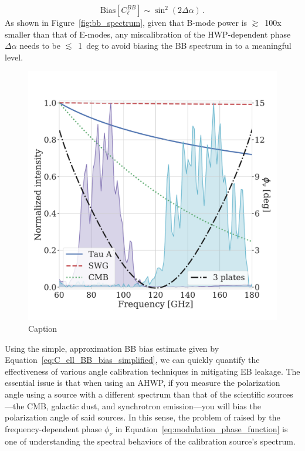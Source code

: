 \begin{equation}
    \mathrm{Bias}\left[ C_{\ell}^{BB} \right] \sim \sin^{2} \left( 2 \Delta \alpha \right) \, .
    \label{eq:C_ell_BB_bias_simplified}
\end{equation}
As shown in Figure~\ref{fig:bb_spectrum}, given that B-mode power is $\gtrsim$~100x smaller than that of E-modes, any miscalibration of the HWP-dependent phase $\Delta \alpha$ needs to be $\lesssim$~1~deg to avoid biasing the BB spectrum in to a meaningful level.

\begin{figure}[!t]
    \centering
    \includegraphics[width=0.6\linewidth, trim=0cm 1cm 0cm 2cm, clip]{PolarizationModulation/Figures/angle_calibration_spectra.pdf}
    \caption{Caption}
    \label{fig:angle_calibration_spectra}
\end{figure}

Using the simple, approximation BB bias estimate given by Equation~\ref{eq:C_ell_BB_bias_simplified}, we can quickly quantify the effectiveness of various angle calibration techniques in mitigating EB leakage. The essential issue is that when using an AHWP, if you measure the polarization angle using a source with a different spectrum than that of the scientific sources---the CMB, galactic dust, and synchrotron emission---you will bias the polarization angle of said sources. In this sense, the problem of raised by the frequency-dependent phase $\phi_{\nu}$ in Equation~\ref{eq:modulation_phase_function} is one of understanding the spectral behaviors of the calibration source's spectrum.

